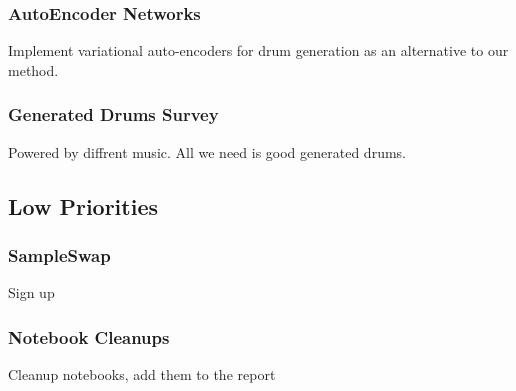 \documentclass{article}
\begin{document}
\subsubsection{AutoEncoder Networks}
Implement variational auto-encoders for drum generation as an alternative to our method. 
\subsubsection{Generated Drums Survey}
Powered by diffrent music. All we need is good generated drums.
\subsection{Low Priorities}
\subsubsection{SampleSwap}
Sign up
\subsubsection{Notebook Cleanups}
Cleanup notebooks, add them to the report


\end{document}
